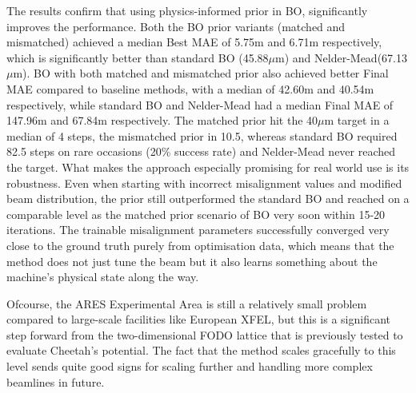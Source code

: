 The results confirm that using physics-informed prior in BO, significantly improves the performance. Both the BO prior variants (matched and mismatched) achieved a median Best MAE of \SI{5.75}{\mu}m and \SI{6.71}{\mu}m respectively, which is significantly better than standard BO (45.88$\mu$m) and Nelder-Mead(67.13$\mu$m).
BO with both matched and mismatched prior also achieved better Final MAE compared to baseline methods, with a median of \SI{42.60}{\mu}m and \SI{40.54}{\mu}m respectively, while standard BO and Nelder-Mead had a median Final MAE of \SI{147.96}{\mu}m and \SI{67.84}{\mu}m respectively.
The matched prior hit the 40$\mu$m target in a median of 4 steps, the mismatched prior in 10.5, whereas standard BO required 82.5 steps on rare occasions (20\% success rate) and 
Nelder-Mead never reached the target. What makes the approach especially promising for real world use is its robustness. Even when starting with incorrect misalignment values 
and modified beam distribution, the prior still outperformed the standard BO and reached on a comparable level as the matched prior scenario 
of BO very soon within 15-20 iterations. The trainable misalignment parameters successfully converged very close to the ground truth purely from optimisation data, which means that the method does 
not just tune the beam but it also learns something about the machine's physical state along the way.  \

Ofcourse, the ARES Experimental Area is still a relatively small problem compared to large-scale facilities like European XFEL, 
but this is a significant step forward from the two-dimensional FODO lattice that is previously tested to evaluate Cheetah's potential. The fact that the method scales gracefully 
to this level sends quite good signs for scaling further and handling more complex beamlines in future. 



